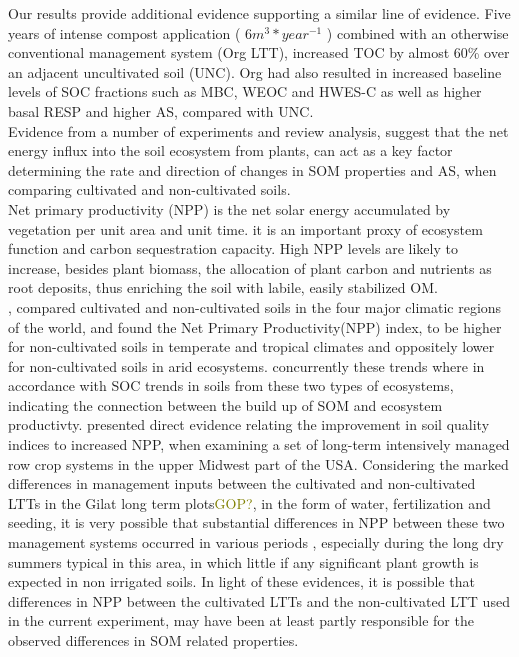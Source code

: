 \documentclass[12pt]{report}
\newcommand{\myGreen}[1]{\textcolor{olive}{#1}} %
\begin{document}
			Our results provide additional evidence supporting a similar line of evidence. Five years of intense compost application ( $ 6 m^3*year^{-1} $ ) combined with an otherwise conventional management system (Org LTT), increased TOC by almost 60\% over an adjacent uncultivated soil (UNC). Org had also resulted in increased baseline levels of SOC fractions such as MBC, WEOC  and HWES-C  as well as higher basal RESP and higher AS, compared with UNC. \\
			Evidence from a number of experiments and review analysis, suggest that the net energy influx into the soil ecosystem from plants, can act as a key factor determining the rate and direction of changes in SOM properties  and AS, when comparing cultivated and non-cultivated soils. \\
			Net primary productivity (NPP) is the net solar energy accumulated by vegetation per unit area and unit time. it is an important proxy of ecosystem function and carbon sequestration capacity\citep{jackson2016}. High NPP levels are likely to increase, besides plant biomass, the allocation of plant carbon and nutrients as root deposits, thus enriching the soil with labile, easily stabilized OM.  \\
			\citeauthor{trivedi2016}, compared cultivated and non-cultivated soils in the four major climatic regions of the world, and found the Net Primary Productivity(NPP) index, to be higher for non-cultivated soils in temperate and tropical climates and oppositely lower for non-cultivated soils in arid ecosystems. concurrently these trends where in accordance with SOC trends in soils from these two types of ecosystems, indicating the connection between the build up of SOM  and ecosystem productivty. \citet{bhardwaj2011} presented direct evidence relating the improvement in soil quality indices to increased NPP, when examining a set of long-term intensively managed row crop systems in the upper Midwest part of the USA.
			Considering the marked differences in management inputs between the cultivated and non-cultivated LTTs in the Gilat long term plots\myGreen{GOP?}, in the form of water, fertilization and seeding, it is very possible that substantial differences in NPP between these two management systems occurred in various periods , especially during the long dry summers typical in this area, in which little  if any significant plant growth is expected in non irrigated soils. 
			In light of these evidences, it is possible that differences in NPP between the cultivated LTTs and the non-cultivated LTT used in the current experiment, may have been at least partly responsible for the observed differences in SOM related properties.
\end{document}
